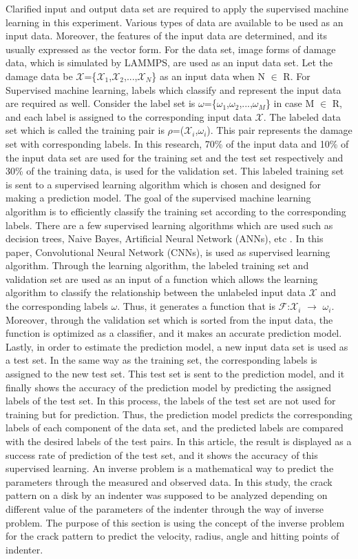 Clarified input and output data set are required to apply the supervised machine learning in this experiment. Various types of data are available to be used as an input data. Moreover, the features of the input data are determined, and its usually expressed as the vector form. For the data set, image forms of damage data, which is simulated by LAMMPS, are used as an input data set. Let the damage data be $\mathcal{X}$=\{$\mathcal{X}_1$,$\mathcal{X}_2$,...,$\mathcal{X}_N$\} as an input data when N $\in$ R. For Supervised machine learning, labels which classify and represent the input data are required as well. Consider the label set is $\omega$=\{$\omega_1$,$\omega_2$,...,$\omega_M$\} in case M $\in$ R, and each label is assigned to the corresponding input data $\mathcal{X}$. The labeled data set which is called the training pair is $\rho$=($\mathcal{X}_i$,$\omega_i$). This pair represents the damage set with corresponding labels. In this research, 70\% of the input data and 10\% of the input data set are used for the training set and the test set respectively and 30\% of the training data, is used for the validation set. This labeled training set is sent to a supervised learning algorithm which is chosen and designed for making a prediction model. The goal of the supervised machine learning algorithm is to efficiently classify the training set according to the corresponding labels. There are a few supervised learning algorithms which are used such as decision trees, Naive Bayes, Artificial Neural Network (ANNs), etc \cite{Ref18}. In this paper, Convolutional Neural Network (CNNs), is used as supervised learning algorithm. Through the learning algorithm, the labeled training set and validation set are used as an input of a function which allows the learning algorithm to classify the relationship between the unlabeled input data $\mathcal{X}$ and the corresponding labels $\omega$. Thus, it generates a function that is $\mathcal{F}$:$\mathcal{X}_i$ $\rightarrow$ $\omega_i$. Moreover, through the validation set which is sorted from the input data, the function is optimized as a classifier, and it makes an accurate prediction model. Lastly, in order to estimate the prediction model, a new input data set is used as a test set. In the same way as the training set, the corresponding labels is assigned to the new test set. This test set is sent to the prediction model, and it finally shows the accuracy of the prediction model by predicting the assigned labels of the test set. In this process, the labels of the test set are not used for training but for prediction. Thus, the prediction model predicts the corresponding labels of each component of the data set, and the predicted labels are compared with the desired labels of the test pairs. In this article, the result is displayed as a success rate of prediction of the test set, and it shows the accuracy of this supervised learning. An inverse problem is a mathematical way to predict the parameters through the measured and observed data. In this study, the crack pattern on a disk by an indenter was supposed to be analyzed depending on different value of the parameters of the indenter through the way of inverse problem. The purpose of this section is using the concept of the inverse problem for the crack pattern to predict the velocity, radius, angle and hitting points of indenter.
